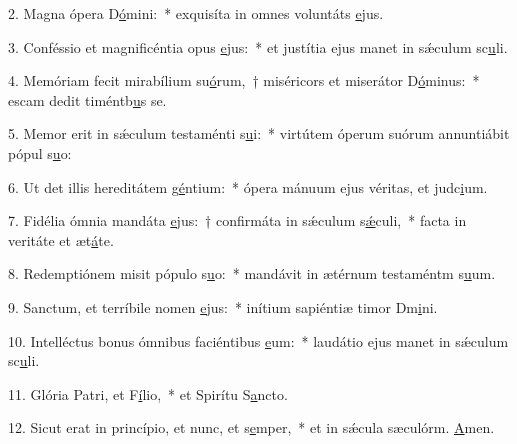 2. Magna ópera D\uline{ó}mini:~* exquisíta in omnes voluntáts \uline{e}jus.\par 
3. Conféssio et magnificéntia opus \uline{e}jus:~* et justítia ejus manet in sǽculum sc\uline{u}li.\par 
4. Memóriam fecit mirabílium su\uline{ó}rum,~† miséricors et miserátor D\uline{ó}minus:~* escam dedit timéntb\uline{u}s se.\par 
5. Memor erit in sǽculum testaménti s\uline{u}i:~* virtútem óperum suórum annuntiábit pópul s\uline{u}o:\par 
6. Ut det illis hereditátem g\uline{é}ntium:~* ópera mánuum ejus véritas, et judc\uline{i}um.\par 
7. Fidélia ómnia mandáta \uline{e}jus:~† confirmáta in sǽculum s\uline{ǽ}culi,~* facta in veritáte et æt\uline{á}te.\par 
8. Redemptiónem misit pópulo s\uline{u}o:~* mandávit in ætérnum testaméntm s\uline{u}um.\par 
9. Sanctum, et terríbile nomen \uline{e}jus:~* inítium sapiéntiæ timor Dm\uline{i}ni.\par 
10. Intelléctus bonus ómnibus faciéntibus \uline{e}um:~* laudátio ejus manet in sǽculum sc\uline{u}li.\par 
11. Glória Patri, et F\uline{í}lio,~* et Spirítu S\uline{a}ncto.\par 
12. Sicut erat in princípio, et nunc, et s\uline{e}mper,~* et in sǽcula sæculórm. \uline{A}men.\par 
